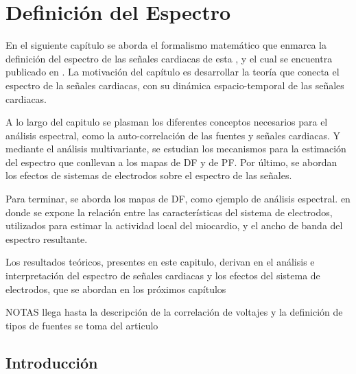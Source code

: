 \chapter{Definición  del Espectro}

\begin{resumen}

En el siguiente capítulo se aborda el formalismo matemático que enmarca la definición del espectro de las señales cardiacas de esta \nombreDoc, y el cual se encuentra publicado en \cite{Requena13b}. La motivación del capítulo es desarrollar la teoría que conecta el espectro de la señales cardiacas, con su dinámica espacio-temporal de las señales cardiacas.

A lo largo del capitulo se plasman los diferentes conceptos necesarios para el análisis espectral, como la auto-correlación de las fuentes y señales cardiacas. Y mediante el análisis multivariante, se estudian los mecanismos para la estimación del espectro que conllevan a los mapas de \acf{DF} y de \acf{PF}. Por último, se abordan los efectos de sistemas de electrodos sobre el espectro de las señales.


Para terminar, se aborda los mapas de \ac{DF}, como ejemplo de análisis espectral. en donde se expone la relación entre las características del sistema de electrodos, utilizados para estimar la actividad local del miocardio, y el ancho de banda del espectro resultante.

Los resultados teóricos, presentes en este capitulo, derivan en el análisis e
interpretación del espectro de señales cardiacas y los efectos del sistema
de electrodos, que se abordan en los próximos capítulos

NOTAS llega hasta la descripción de la correlación de voltajes  y la definición de tipos de fuentes se toma del articulo


\end{resumen}


\section{Introducción}

